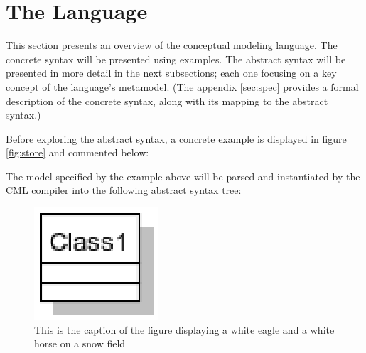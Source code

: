\section{The Language}\label{sec:lang}
%
This section presents an overview of the conceptual modeling language.
The concrete syntax will be presented using examples.
The abstract syntax will be presented in more detail in the next subsections; each one focusing on a key concept of the language's metamodel. (The appendix \ref{sec:spec} provides a formal description of the concrete syntax, along with its mapping to the abstract syntax.)

Before exploring the abstract syntax, a concrete example is displayed in figure \ref{fig:store} and commented below:



The model specified by the example above will be parsed and instantiated by the CML compiler into the following abstract syntax tree:

\label{fig:ast}
\begin{figure}
\centering
\includegraphics{language/main}
\caption{This is the caption of the figure displaying a white eagle and
a white horse on a snow field}
\end{figure}
